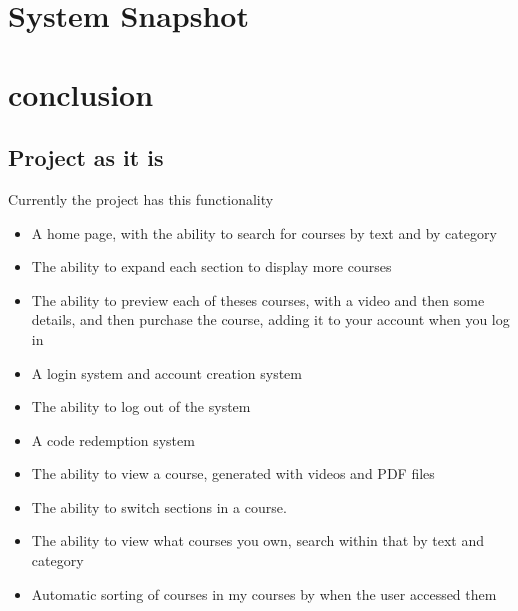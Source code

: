 \documentclass{article}
\begin{document}
\section{System Snapshot}



\section{conclusion}

\subsection{Project as it is}
Currently the project has this functionality  
\begin{itemize}
  \item A home page, with the ability to search for courses by text and by category
  \item The ability to expand each section to display more courses
  \item The ability to preview each of theses courses, with a video and then some details, and then purchase the course, adding it to your account when you log in
  \item A login system and account creation system
  \item The ability to log out of the system
  \item A code redemption system
  \item The ability to view a course, generated with videos and PDF files
  \item The ability to switch sections in a course.
  \item The ability to view what courses you own, search within that by text and category
  \item Automatic sorting of courses in my courses by when the user accessed them
\end{itemize}
\end{document}
